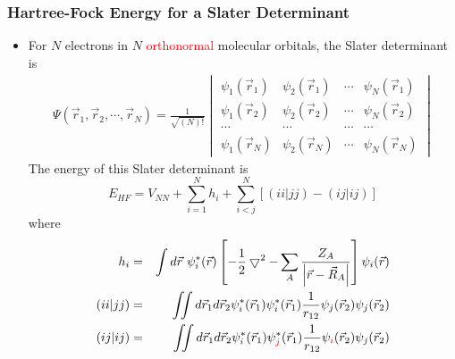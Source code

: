 \documentclass[handout]{beamer} %
\begin{document}
\begin{frame}
\frametitle{Hartree-Fock Energy for a Slater Determinant}

\begin{itemize}

\item  \small{For $N$ electrons in $N$ \textcolor{red}{orthonormal} molecular orbitals, the Slater determinant is }
\footnotesize{
\begin{eqnarray*}
\Psi(\vec{r}_1, \vec{r}_2, \cdots, \vec{r}_N)  = \frac{1}{\sqrt{(N)!}} 
\begin{vmatrix} 
   \psi_{1} (\vec{r}_1)  &  \psi_{2} (\vec{r}_1)  & \cdots &    \psi_{N} (\vec{r}_1) \\
  \psi_{1} (\vec{r}_2)  &  \psi_{2} (\vec{r}_2)  & \cdots &    \psi_{N} (\vec{r}_2) \\
   \cdots & \cdots & \cdots & \cdots \\   
   \psi_{1} (\vec{r}_N)  &  \psi_{2} (\vec{r}_N)  & \cdots &    \psi_{N} (\vec{r}_N)
\end{vmatrix} 
\end{eqnarray*}  
}  
The energy of this Slater determinant is 
\begin{equation*}
E_{HF} = V_{NN} +  \sum_{i=1}^N h_i + \sum_{i<j}^{N} \left[ (ii|jj) - (ij|ij) \right]
\end{equation*}
where 
\scriptsize{
\begin{eqnarray*}
h_{i} & = & \int d\vec{r}~ \psi^*_i (\vec{r}) \left[ -\frac{1}{2} \bigtriangledown^2 - \sum_A \frac{Z_A}{ \left| \vec{r} - \vec{R}_A \right| } \right] \psi_i (\vec{r})  \\
(ii|jj) &  =  & \iint d\vec{r}_1 d\vec{r}_2 \psi^*_i (\vec{r}_1) \psi^*_i(\vec{r}_1) \frac{1}{r_{12}} \psi_j ( \vec{r}_2)  \psi_j(\vec{r}_2)   \\
(ij|ij) &  =  & \iint d\vec{r}_1 d\vec{r}_2 \psi^*_i (\vec{r}_1) \psi^*_{\textcolor{red}{j}}(\vec{r}_1) \frac{1}{r_{12}} \psi_{\textcolor{red}{i}} (\vec{r}_2)  \psi_j(\vec{r}_2)  
\end{eqnarray*}
}
\end{itemize}
\end{frame}
\end{document}
